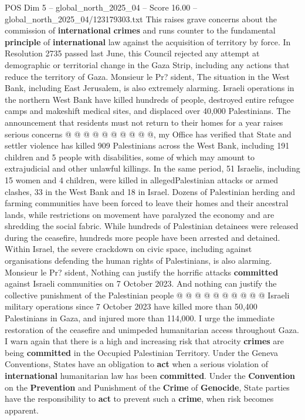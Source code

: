 \begin{textsample}{POS Dim 5 – global\_north\_2025\_04 – Score 16.00 – global\_north\_2025\_04/123179303.txt}
This raises grave concerns about the commission of \textbf{international} \textbf{crimes} and runs counter to the fundamental \textbf{principle} of \textbf{international} law against the acquisition of territory by force.
In Resolution 2735 passed last June, this Council rejected any attempt at demographic or territorial change in the Gaza Strip, including any actions that reduce the territory of Gaza.
Monsieur le Pr? sident, The situation in the West Bank, including East Jerusalem, is also extremely alarming.
Israeli operations in the northern West Bank have killed hundreds of people, destroyed entire refugee camps and makeshift medical sites, and displaced over 40,000 Palestinians.
The announcement that residents must not return to their homes for a year raises serious concerns @ @ @ @ @ @ @ @ @ @, my Office has verified that State and settler violence has killed 909 Palestinians across the West Bank, including 191 children and 5 people with disabilities, some of which may amount to extrajudicial and other unlawful killings.
In the same period, 51 Israelis, including 15 women and 4 children, were killed in allegedPalestinian attacks or armed clashes, 33 in the West Bank and 18 in Israel.
Dozens of Palestinian herding and farming communities have been forced to leave their homes and their ancestral lands, while restrictions on movement have paralyzed the economy and are shredding the social fabric.
While hundreds of Palestinian detainees were released during the ceasefire, hundreds more people have been arrested and detained.
Within Israel, the severe crackdown on civic space, including against organisations defending the human rights of Palestinians, is also alarming.
Monsieur le Pr? sident, Nothing can justify the horrific attacks \textbf{committed} against Israeli communities on 7 October 2023.
And nothing can justify the collective punishment of the Palestinian people @ @ @ @ @ @ @ @ @ @ Israeli military operations since 7 October 2023 have killed more than 50,400 Palestinians in Gaza, and injured more than 114,000.
I urge the immediate restoration of the ceasefire and unimpeded humanitarian access throughout Gaza.
I warn again that there is a high and increasing risk that atrocity \textbf{crimes} are being \textbf{committed} in the Occupied Palestinian Territory.
Under the Geneva Conventions, States have an obligation to \textbf{act} when a serious violation of \textbf{international} humanitarian law has been \textbf{committed}.
Under the \textbf{Convention} on the \textbf{Prevention} and Punishment of the \textbf{Crime} of \textbf{Genocide}, State parties have the responsibility to \textbf{act} to prevent such a \textbf{crime}, when risk becomes apparent.

\end{textsample}
